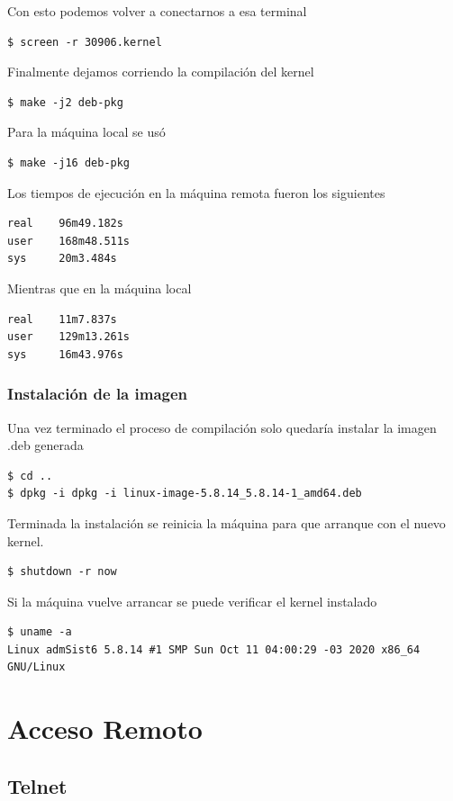 \documentclass[12pt]{article}
\begin{document}
Con esto podemos volver a conectarnos a esa terminal
\begin{lstlisting}[frame=single]
$ screen -r 30906.kernel
\end{lstlisting}

Finalmente dejamos corriendo la compilación del kernel
 
\begin{lstlisting}[frame=single]
$ make -j2 deb-pkg
\end{lstlisting}


Para la máquina local se usó 
\begin{lstlisting}[frame=single]
$ make -j16 deb-pkg
\end{lstlisting}

Los tiempos de ejecución en la máquina remota fueron los siguientes
\begin{lstlisting}[frame=single]
real    96m49.182s
user    168m48.511s
sys     20m3.484s
\end{lstlisting}

Mientras que en la máquina local
\begin{lstlisting}[frame=single]
real    11m7.837s
user    129m13.261s
sys     16m43.976s
\end{lstlisting}

\subsubsection{Instalación de la imagen}

Una vez terminado el proceso de compilación solo quedaría instalar la imagen .deb generada
\begin{lstlisting}[frame=single]
$ cd ..
$ dpkg -i dpkg -i linux-image-5.8.14_5.8.14-1_amd64.deb
\end{lstlisting}

Terminada la instalación se reinicia la máquina para que arranque con el nuevo kernel. 
\begin{lstlisting}[frame=single]
$ shutdown -r now
\end{lstlisting}
Si la máquina vuelve arrancar se puede verificar el kernel instalado
\begin{lstlisting}[frame=single]
$ uname -a
Linux admSist6 5.8.14 #1 SMP Sun Oct 11 04:00:29 -03 2020 x86_64 GNU/Linux
\end{lstlisting}
\newpage
\section{Acceso Remoto}
\subsection{Telnet}
\end{document}
